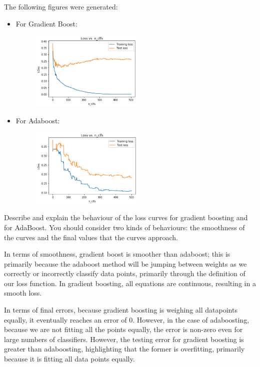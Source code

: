 \begin{solution}
  The following figures were generated:
  \begin{itemize}
      \item For Gradient Boost:
      \begin{figure}[H]
        \begin{center}
        \includegraphics[width=0.5\textwidth]{Loss_GB.png}
        \end{center}
        \end{figure}
      \item For Adaboost:
      \begin{figure}[H]
        \begin{center}
        \includegraphics[width=0.5\textwidth]{Loss_AB.png}
        \end{center}
        \end{figure}
  \end{itemize}
\end{solution}

\begin{problem}[2]
    Describe and explain the behaviour of the loss curves for gradient boosting and for AdaBoost. You should consider two kinds of behaviours: the smoothness of the curves and the final values that the curves approach.
\end{problem}

\begin{solution}
  In terms of smoothness, gradient boost is smoother than adaboost; this is primarily because the adaboost method will be jumping between weights as we correctly or incorrectly classify data points, primarily through the definition of our loss function. In gradient boosting, all equations are continuous, resulting in a smooth loss.
  
  In terms of final errors, because gradient boosting is weighing all datapoints equally, it eventually reaches an error of 0. However, in the case of adaboosting, because we are not fitting all the points equally, the error is non-zero even for large numbers of classifiers. However, the testing error for gradient boosting is greater than adaboosting, highlighting that the former is overfitting, primarily because it is fitting all data points equally. 
\end{solution}


